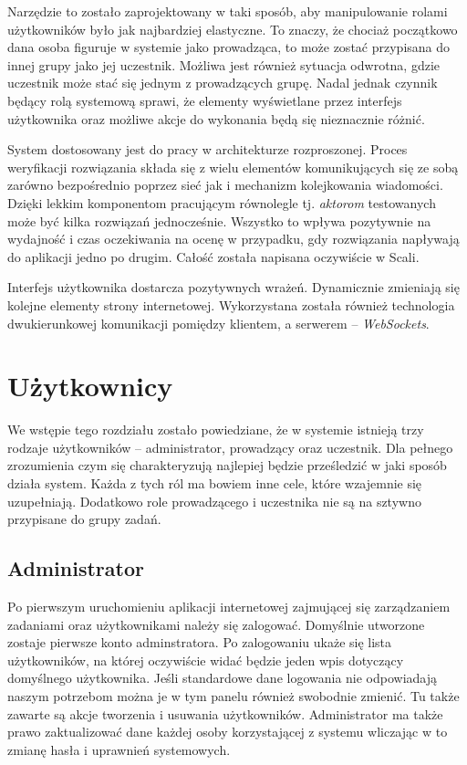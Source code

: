 \documentclass[brudnopis]{xmgr}
\begin{document}
Narzędzie to zostało zaprojektowany w taki sposób, aby manipulowanie rolami użytkowników było jak najbardziej elastyczne. To znaczy, że chociaż początkowo dana osoba figuruje w systemie jako prowadząca, to może zostać przypisana do innej grupy jako jej uczestnik. Możliwa jest również sytuacja odwrotna, gdzie uczestnik może stać się jednym z prowadzących grupę. Nadal jednak czynnik będący rolą systemową sprawi, że elementy wyświetlane przez interfejs użytkownika oraz możliwe akcje do wykonania będą się nieznacznie różnić.

System dostosowany jest do pracy w architekturze rozproszonej. Proces weryfikacji rozwiązania składa się z wielu elementów komunikujących się ze sobą zarówno bezpośrednio poprzez sieć jak i mechanizm kolejkowania wiadomości. Dzięki lekkim komponentom pracującym równolegle tj. \emph{aktorom} testowanych może być kilka rozwiązań jednocześnie. Wszystko to wpływa pozytywnie na wydajność i czas oczekiwania na ocenę w przypadku, gdy rozwiązania napływają do aplikacji jedno po drugim. Całość została napisana oczywiście w Scali. 
 
Interfejs użytkownika dostarcza pozytywnych wrażeń. Dynamicznie zmieniają się kolejne elementy strony internetowej. Wykorzystana została również technologia dwukierunkowej komunikacji pomiędzy klientem, a serwerem -- \emph{WebSockets}. 

\section{Użytkownicy}

We wstępie tego rozdziału zostało powiedziane, że w systemie istnieją trzy rodzaje użytkowników -- administrator, prowadzący oraz uczestnik. Dla pełnego zrozumienia czym się charakteryzują najlepiej będzie prześledzić w jaki sposób działa system. Każda z tych ról ma bowiem inne cele, które wzajemnie się uzupełniają. Dodatkowo role prowadzącego i uczestnika nie są na sztywno przypisane do grupy zadań. 

\subsection{Administrator}

Po pierwszym uruchomieniu aplikacji internetowej zajmującej się zarządzaniem zadaniami oraz użytkownikami należy się zalogować. Domyślnie utworzone zostaje pierwsze konto adminstratora. Po zalogowaniu ukaże się lista użytkowników, na której oczywiście widać będzie jeden wpis dotyczący domyślnego użytkownika. Jeśli standardowe dane logowania nie odpowiadają naszym potrzebom można je w tym panelu również swobodnie zmienić. Tu także zawarte są akcje tworzenia i usuwania użytkowników. Administrator ma także prawo zaktualizować dane każdej osoby korzystającej z systemu wliczając w to zmianę hasła i uprawnień systemowych.
\end{document}
